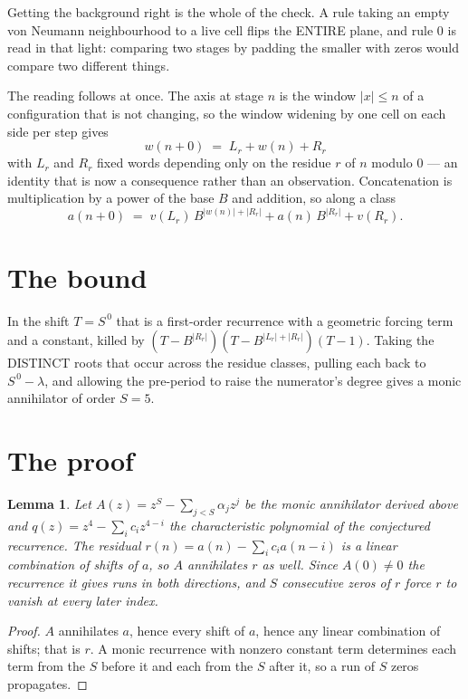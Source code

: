 \documentclass[11pt,a4paper]{article}
\theoremstyle{plain}
\newtheorem{lemma}[theorem]{Lemma}
\theoremstyle{definition}
\begin{document}
Getting the background right is the whole of the check. A rule taking an empty von Neumann
neighbourhood to a live cell flips the ENTIRE plane, and rule 0 is read
in that light: comparing two stages by padding the smaller with zeros would compare two
different things.

The reading follows at once. The axis at stage $n$ is the window $|x|\le n$ of a configuration
that is not changing, so the window widening by one cell on each side per step gives
\[
w(n+0)\;=\;L_r + w(n) + R_r
\]
with $L_r$ and $R_r$ fixed words depending only on the residue $r$ of $n$ modulo $0$ --- an
identity that is now a consequence rather than an observation. Concatenation is multiplication
by a power of the base $B$ and addition, so along a class
\[
a(n+0)\;=\;v(L_r)\,B^{|w(n)|+|R_r|} + a(n)\,B^{|R_r|} + v(R_r).
\]

\section{The bound}

In the shift $T=S^{\,0}$ that is a first-order recurrence with a geometric forcing term and a
constant, killed by $(T-B^{|R_r|})(T-B^{|L_r|+|R_r|})(T-1)$. Taking the DISTINCT roots that
occur across the residue classes, pulling each back to $S^{\,0}-\lambda$, and allowing the
pre-period to raise the numerator's degree gives a monic annihilator of order $S=5$.

\section{The proof}

\begin{lemma}\label{lem:crit}
Let $A(z)=z^S-\sum_{j<S}\alpha_jz^{j}$ be the monic annihilator derived above and
$q(z)=z^{4}-\sum_ic_iz^{4-i}$ the characteristic polynomial of the conjectured
recurrence. The residual $r(n)=a(n)-\sum_ic_ia(n-i)$ is a linear combination of shifts of $a$,
so $A$ annihilates $r$ as well. Since $A(0)\ne0$ the recurrence it gives runs in both
directions, and $S$ consecutive zeros of $r$ force $r$ to vanish at every later index.
\end{lemma}

\begin{proof}
$A$ annihilates $a$, hence every shift of $a$, hence any linear combination of shifts; that is
$r$. A monic recurrence with nonzero constant term determines each term from the $S$ before it
and each from the $S$ after it, so a run of $S$ zeros propagates.
\end{proof}
\end{document}
